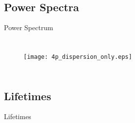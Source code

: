 \documentclass{beamer}
\begin{document}
\subsection{Power Spectra}
\begin{frame}{Power Spectrum}
\begin{columns}
\begin{figure}[t]
\vspace*{-1cm}
\hspace*{-0.9cm}
\texttt{[image: 4p\_dispersion\_only.eps]}
\renewcommand{\figure}{Fig.}
\label{fig:disp_4p}
\end{figure}
\begin{figure}[t]
\vspace*{-1.2cm}
\hspace*{1.9cm}
\renewcommand{\figure}{Fig.}
\label{fig:sed}
\end{figure}
\end{columns}
\end{frame}

\subsection{Lifetimes}
\begin{frame}{Lifetimes}
\begin{figure}[!h]
\begin{center}
\vspace*{-0.8cm}
\renewcommand{\figure}{Fig.}
\label{fig:lifetimes}
\end{center}
\end{figure}
\end{frame}

\end{document}
